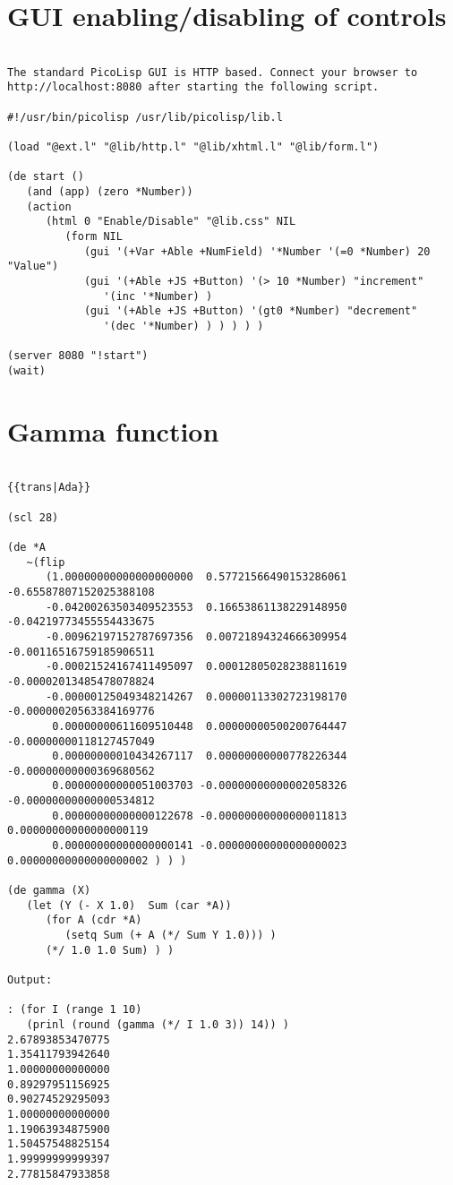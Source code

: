 \section*{GUI enabling/disabling of controls}

\begin{verbatim}

The standard PicoLisp GUI is HTTP based. Connect your browser to
http://localhost:8080 after starting the following script.

#!/usr/bin/picolisp /usr/lib/picolisp/lib.l

(load "@ext.l" "@lib/http.l" "@lib/xhtml.l" "@lib/form.l")

(de start ()
   (and (app) (zero *Number))
   (action
      (html 0 "Enable/Disable" "@lib.css" NIL
         (form NIL
            (gui '(+Var +Able +NumField) '*Number '(=0 *Number) 20 "Value")
            (gui '(+Able +JS +Button) '(> 10 *Number) "increment"
               '(inc '*Number) )
            (gui '(+Able +JS +Button) '(gt0 *Number) "decrement"
               '(dec '*Number) ) ) ) ) )

(server 8080 "!start")
(wait)

\end{verbatim}

\section*{Gamma function}

\begin{verbatim}

{{trans|Ada}}

(scl 28)

(de *A
   ~(flip
      (1.00000000000000000000  0.57721566490153286061 -0.65587807152025388108
      -0.04200263503409523553  0.16653861138229148950 -0.04219773455554433675
      -0.00962197152787697356  0.00721894324666309954 -0.00116516759185906511
      -0.00021524167411495097  0.00012805028238811619 -0.00002013485478078824
      -0.00000125049348214267  0.00000113302723198170 -0.00000020563384169776
       0.00000000611609510448  0.00000000500200764447 -0.00000000118127457049
       0.00000000010434267117  0.00000000000778226344 -0.00000000000369680562
       0.00000000000051003703 -0.00000000000002058326 -0.00000000000000534812
       0.00000000000000122678 -0.00000000000000011813  0.00000000000000000119
       0.00000000000000000141 -0.00000000000000000023  0.00000000000000000002 ) ) )

(de gamma (X)
   (let (Y (- X 1.0)  Sum (car *A))
      (for A (cdr *A)
         (setq Sum (+ A (*/ Sum Y 1.0))) )
      (*/ 1.0 1.0 Sum) ) )

Output:

: (for I (range 1 10)
   (prinl (round (gamma (*/ I 1.0 3)) 14)) )
2.67893853470775
1.35411793942640
1.00000000000000
0.89297951156925
0.90274529295093
1.00000000000000
1.19063934875900
1.50457548825154
1.99999999999397
2.77815847933858

\end{verbatim}

